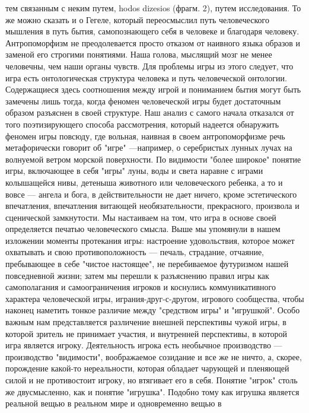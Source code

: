 \documentclass[12pt]{article}
\begin{document}
тем связанным с неким путем, hodos dizesios (фрагм. 2), путем исследования. То же можно сказать и о Гегеле,
который  переосмыслил  путь  человеческого  мышления  в  путь  бытия,  самопознающего  себя  в  человеке  и
благодаря человеку. Антропоморфизм не преодолевается просто отказом от наивного языка образов и заменой
его строгими понятиями. Наша голова, мыслящий мозг не менее человечны, чем наши органы чувств. Для
проблемы  игры  из  этого  следует,  что  игра  есть  онтологическая  структура  человека  и  путь  человеческой
онтологии. Содержащиеся здесь соотношения между игрой и пониманием бытия могут быть замечены лишь
тогда, когда феномен человеческой игры будет достаточным образом разъяснен в своей структуре. Наш анализ с
самого начала отказался от того поэтизирующего способа рассмотрения, который надеется обнаружить феномен
игры  повсюду,  где  вольная,  наивная  в  своем  антропоморфизме  речь  метафорически  говорит  об  "игре"  ---например, о серебристых лунных лучах на волнуемой ветром морской поверхности. По видимости "более
широкое" понятие игры, включающее в себя "игры" луны, воды и света наравне с играми колышащейся нивы,
детеныша животного или человеческого ребенка, а то и вовсе --- ангела и бога, в действительности не дает
ничего, кроме эстетического впечатления, впечатления витающей необязательности, прекрасного, произвола и
сценической замкнутости. Мы настаиваем на том, что игра в основе своей определяется печатью человеческого
смысла. Выше мы упомянули в нашем изложении моменты протекания игры: настроение удовольствия, которое
может охватывать и свою противоположность --- печаль, страдание, отчаяние, пребывающее в себе "чистое
настоящее", не перебиваемое футуризмом нашей повседневной жизни; затем мы перешли к разъяснению правил
игры как самополагания и самоограничения игроков и коснулись коммуникативного характера человеческой
игры, играния-друг-с-другом, игрового сообщества, чтобы наконец наметить тонкое различие между "средством
игры"  и "игрушкой". Особо  важным нам представляется различение  внешней перспективы чужой игры,  в
которой  зритель  не  принимает  участия,  и  внутренней  перспективы,  в  которой  игра  является  игроку.
Деятельность игрока есть необычное производство --- производство "видимости", воображаемое созидание и все
же не ничто, а, скорее, порождение какой-то нереальности, которая обладает чарующей и пленяющей силой и не
противостоит  игроку,  но  втягивает  его  в  себя.  Понятие  "игрок"  столь  же  двусмысленно,  как  и  понятие
"игрушка". Подобно тому как игрушка является реальной вещью в реальном мире и одновременно вещью в
\end{document}
